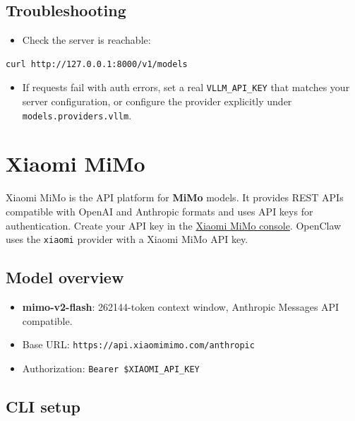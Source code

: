 \subsection{Troubleshooting}


\begin{itemize}
  \item Check the server is reachable:
\end{itemize}


\begin{lstlisting}[language=bash]
curl http://127.0.0.1:8000/v1/models
\end{lstlisting}


\begin{itemize}
  \item If requests fail with auth errors, set a real \texttt{VLLM\_API\_KEY} that matches your server configuration, or configure the provider explicitly under \texttt{models.providers.vllm}.
\end{itemize}



\clearpage

\section{Xiaomi MiMo}


Xiaomi MiMo is the API platform for \textbf{MiMo} models. It provides REST APIs compatible with
OpenAI and Anthropic formats and uses API keys for authentication. Create your API key in
the \href{https://platform.xiaomimimo.com/\#/console/api-keys}{Xiaomi MiMo console}. OpenClaw uses
the \texttt{xiaomi} provider with a Xiaomi MiMo API key.

\subsection{Model overview}


\begin{itemize}
  \item \textbf{mimo-v2-flash}: 262144-token context window, Anthropic Messages API compatible.
  \item Base URL: \texttt{https://api.xiaomimimo.com/anthropic}
  \item Authorization: \texttt{Bearer \$XIAOMI\_API\_KEY}
\end{itemize}


\subsection{CLI setup}


